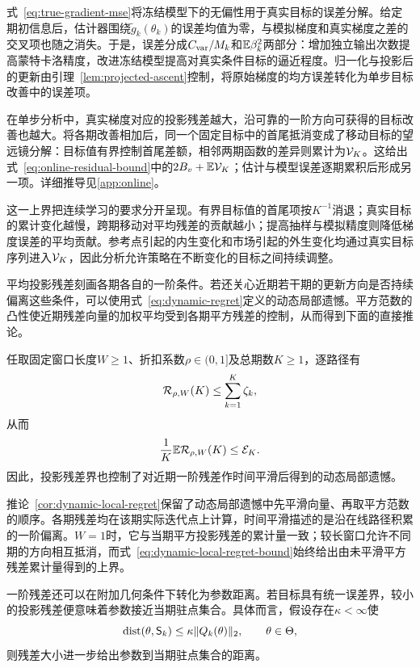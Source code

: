 式~\eqref{eq:true-gradient-mse}将冻结模型下的无偏性用于真实目标的误差分解。给定期初信息后，估计器围绕$\widetilde g_k(\theta_k)$的误差均值为零，与模拟梯度和真实梯度之差的交叉项也随之消失。于是，误差分成$C_{\rm var}/M_k$和$\mathbb E\beta_k^2$两部分：增加独立输出次数提高蒙特卡洛精度，改进冻结模型提高对真实条件目标的逼近程度。归一化与投影后的更新由引理~\ref{lem:projected-ascent}控制，将原始梯度的均方误差转化为单步目标改善中的误差项。

在单步分析中，真实梯度对应的投影残差越大，沿可靠的一阶方向可获得的目标改善也越大。将各期改善相加后，同一个固定目标中的首尾抵消变成了移动目标的望远镜分解：目标值有界控制首尾差额，相邻两期函数的差异则累计为$\mathcal V_K$。这给出式~\eqref{eq:online-residual-bound}中的$2B_v+\mathbb E\mathcal V_K$；估计与模型误差逐期累积后形成另一项。详细推导见\ref{app:online}。

这一上界把连续学习的要求分开呈现。有界目标值的首尾项按$K^{-1}$消退；真实目标的累计变化越慢，跨期移动对平均残差的贡献越小；提高抽样与模拟精度则降低梯度误差的平均贡献。参考点引起的内生变化和市场引起的外生变化均通过真实目标序列进入$\mathcal V_K$，因此分析允许策略在不断变化的目标之间持续调整。

平均投影残差刻画各期各自的一阶条件。若还关心近期若干期的更新方向是否持续偏离这些条件，可以使用式~\eqref{eq:dynamic-regret}定义的动态局部遗憾。平方范数的凸性使近期残差向量的加权平均受到各期平方残差的控制，从而得到下面的直接推论。

\begin{corollary}[动态局部遗憾]\label{cor:dynamic-local-regret}
任取固定窗口长度$W\ge1$、折扣系数$\rho\in(0,1]$及总期数$K\ge1$，逐路径有
\begin{equation}\label{eq:dynamic-local-regret-bound}
 \mathcal R_{\rho,W}(K)
 \le \sum_{k=1}^{K}\zeta_k,
\end{equation}
从而
\begin{equation}\label{eq:average-dynamic-local-regret-bound}
 \frac1K\mathbb E\mathcal R_{\rho,W}(K)
 \le \mathcal E_K.
\end{equation}
因此，投影残差界也控制了对近期一阶残差作时间平滑后得到的动态局部遗憾。
\end{corollary}

推论~\ref{cor:dynamic-local-regret}保留了动态局部遗憾中先平滑向量、再取平方范数的顺序。各期残差均在该期实际迭代点上计算，时间平滑描述的是沿在线路径积累的一阶偏离。$W=1$时，它与当期平方投影残差的累计量一致；较长窗口允许不同期的方向相互抵消，而式~\eqref{eq:dynamic-local-regret-bound}始终给出由未平滑平方残差累计量得到的上界。

一阶残差还可以在附加几何条件下转化为参数距离。若目标具有统一误差界，较小的投影残差便意味着参数接近当期驻点集合。具体而言，假设存在$\kappa<\infty$使
\begin{equation}\label{eq:error-bound}
 \operatorname{dist}(\theta,\mathsf S_k)
 \le \kappa\lVert Q_k(\theta)\rVert_2,
 \qquad \theta\in\Theta,
\end{equation}
则残差大小进一步给出参数到当期驻点集合的距离。

